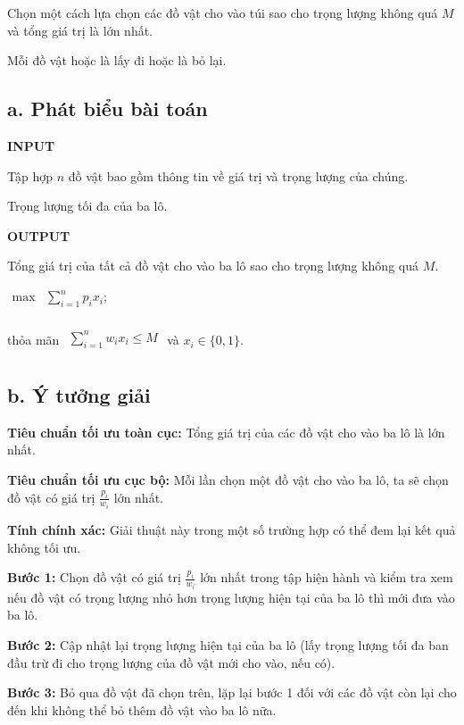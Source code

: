 \documentclass[12pt, a4paper, fleqn]{article}
\begin{document}
	Chọn một cách lựa chọn các đồ vật cho vào túi sao cho trọng lượng không quá $M$ và tổng giá trị là lớn nhất.
	
	Mỗi đồ vật hoặc là lấy đi hoặc là bỏ lại.
	
	\subsection*{a. Phát biểu bài toán}
	
	\textbf{INPUT}
	
	Tập hợp $n$ đồ vật bao gồm thông tin về giá trị và trọng lượng của chúng.
	
	Trọng lượng tối đa của ba lô.
	
	\textbf{OUTPUT}
	
	Tổng giá trị của tất cả đồ vật cho vào ba lô sao cho trọng lượng không quá $M$.
	
	${\displaystyle
		{\begin{aligned}
			\max &\sum _{ i = 1}^{n}p_i x_i;\\
			\end{aligned}}}$
	
	thỏa mãn ${\displaystyle
		{\begin{aligned}
			\sum _{ i = 1}^{n}w_i x_i \leq M\\
			\end{aligned}}}$ và $x_{i}\in \{0,1\}$.
	
	\subsection*{b. Ý tưởng giải}
	
	\textbf{Tiêu chuẩn tối ưu toàn cục:} Tổng giá trị của các đồ vật cho vào ba lô là lớn nhất.
	
	\textbf{Tiêu chuẩn tối ưu cục bộ:} Mỗi lần chọn một đồ vật cho vào ba lô, ta sẽ chọn đồ vật có giá trị $\displaystyle \frac{p_i}{w_i}$ lớn nhất.
	
	\textbf{Tính chính xác:} Giải thuật này trong một số trường hợp có thể đem lại kết quả không tối ưu.
	
	\textbf{Bước 1:} Chọn đồ vật có giá trị $\displaystyle \frac{p_i}{w_i}$ lớn nhất trong tập hiện hành và kiểm tra xem nếu đồ vật có trọng lượng nhỏ hơn trọng lượng hiện tại của ba lô thì mới đưa vào ba lô.
	
	\textbf{Bước 2:} Cập nhật lại trọng lượng hiện tại của ba lô (lấy trọng lượng tối đa ban đầu trừ đi cho trọng lượng của đồ vật mới cho vào, nếu có).
	
	\textbf{Bước 3:} Bỏ qua đồ vật đã chọn trên, lặp lại bước 1 đối với các đồ vật còn lại cho đến khi không thể bỏ thêm đồ vật vào ba lô nữa.
	
\end{document}
